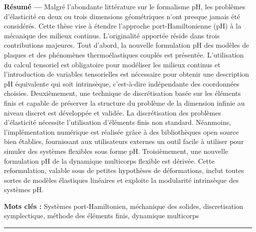 \begin{vcenterpage}
\thispagestyle{empty}
{\large\textbf{Résumé ---}}
 Malgré l'abondante littérature sur le formalisme pH, les problèmes d'élasticité en deux ou trois dimensions géométriques n'ont presque jamais été considérés. Cette thèse vise à étendre l'approche port-Hamiltonienne (pH) à la mécanique des milieux continus. L'originalité apportée réside dans trois contributions majeures. Tout d'abord, la nouvelle formulation pH des modèles de plaques et des phénomènes thermoélastiques couplés est présentée. L'utilisation du calcul tensoriel est obligatoire pour modéliser les milieux  continus et l'introduction de variables tensorielles est nécessaire pour obtenir une description pH équivalente qui soit intrinsèque, c'est-à-dire indépendante des coordonnées choisies. Deuxièmement, une technique de discrétisation basée sur les éléments finis et capable de préserver la structure du problème de la dimension infinie au niveau discret est développée et validée. La discrétisation des problèmes d'élasticité nécessite l'utilisation d'éléments finis non standard. Néanmoins, l'implémentation numérique est réalisée grâce à des bibliothèques open source bien établies, fournissant aux utilisateurs externes un outil facile à utiliser pour simuler des systèmes flexibles sous forme pH. Troisièmement, une nouvelle formulation pH de la dynamique multicorps flexible est dérivée. Cette reformulation, valable sous de petites hypothèses de déformations, inclut toutes sortes de modèles élastiques linéaires et exploite la modularité intrinsèque des systèmes pH.

{\large\textbf{Mots clés :}}
    Systèmes port-Hamiltonien, méchanique des solides, discretisation symplectique, méthode des éléments finis, dynamique multicorps
\\
\noindent\rule[2pt]{\textwidth}{0.5pt}



\end{vcenterpage}
